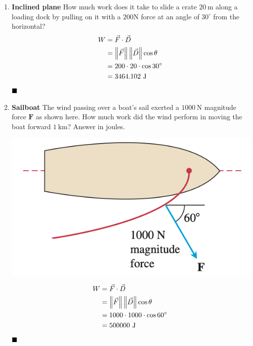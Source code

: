 \begin{enumerate}
    \item \textbf{Inclined plane} How much work does it take to slide a crate $20 \mathrm{~m}$
          along a loading dock by pulling on it with a $200$N force at an angle
          of $30^{\circ}$ from the horizontal?
          \sol{}
          \begin{align*}
              W & = \vec{F} \cdot \vec{D}                     \\
                & = \left\lVert\vec{F}\right\rVert \left\lVert\vec{D}\right\rVert \cos \theta \\
                & = 200 \cdot 20 \cdot \cos 30^{\circ}        \\
                & = 3464.102 \mathrm{~J}
          \end{align*}
          $\hfill\blacksquare$

    \item \textbf{Sailboat} The wind passing over a boat's sail exerted a $1000 \mathrm{~N}$
          magnitude force $\mathbf{F}$ as shown here. How much work did the wind perform
          in moving the boat forward $1 \mathrm{~km}$? Answer in joules.
          \begin{center}
              \includegraphics[scale=0.6]{assets/thomas12.3q46.png}
          \end{center}
          \sol{}
          \begin{align*}
              W & = \vec{F} \cdot \vec{D}                     \\
                & = \left\lVert\vec{F}\right\rVert \left\lVert\vec{D}\right\rVert \cos \theta \\
                & = 1000 \cdot 1000 \cdot \cos 60^{\circ}     \\
                & = 500000 \mathrm{~J}
          \end{align*}
          $\hfill\blacksquare$
\end{enumerate}

